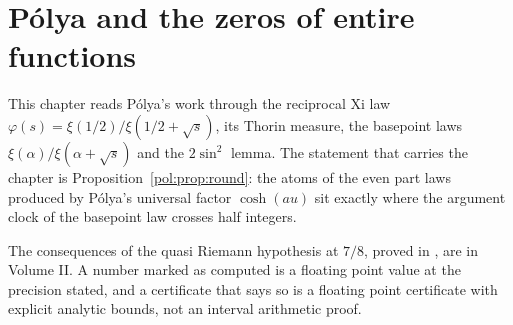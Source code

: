 \chapter{P\'olya and the zeros of entire functions}\label{chap:polyazeros}

This chapter reads P\'olya's work through the reciprocal Xi law $\varphi(s)=\xi(1/2)/\xi(1/2+\sqrt s)$, its Thorin measure, the basepoint laws $\xi(\alpha)/\xi(\alpha+\sqrt s)$ and the $2\sin^2$ lemma. The statement that carries the chapter is Proposition~\ref{pol:prop:round}: the atoms of the even part laws produced by P\'olya's universal factor $\cosh(au)$ sit exactly where the argument clock of the basepoint law crosses half integers.

The consequences of the quasi Riemann hypothesis at $7/8$, proved in \cite{OAI26a}, are in Volume II. A number marked as computed is a floating point value at the precision stated, and a certificate that says so is a floating point certificate with explicit analytic bounds, not an interval arithmetic proof.
